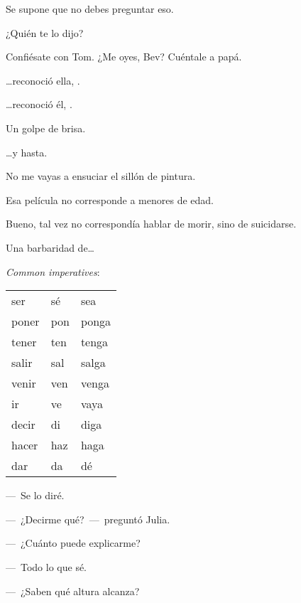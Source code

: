 \sk
Se supone que no debes preguntar eso. 

\sk
¿Quién te lo dijo? 

\sk
Confiésate con Tom. ¿Me oyes, Bev? Cuéntale a papá.

\sk
\ldots{}reconoció ella, . 

\sk
\ldots{}reconoció él, . 

\sk
Un golpe de brisa. 

\sk
\ldots{}y hasta. 

\sk
No me vayas a ensuciar el sillón de pintura. 

\sk
Esa película no corresponde a menores de edad. 

\sk
Bueno, tal vez no correspondía hablar de morir, sino de suicidarse. 

\sk
Una barbaridad de\ldots{} 

\bsk
\textit{Common imperatives}:

\sk
\begin{tabular}{lll}
    ser   & sé  & sea\\
    poner & pon & ponga\\
    tener & ten & tenga\\
    salir & sal & salga\\
    venir & ven & venga\\
    ir    & ve  & vaya\\
    decir & di  & diga\\
    hacer & haz & haga\\
    dar   & da  & dé\\
\end{tabular}

\bsk
---~Se lo diré. 

---~¿Decirme qué?~---~preguntó Julia. 

\sk
---~¿Cuánto puede explicarme? 

---~Todo lo que sé. 

\sk
---~¿Saben qué altura alcanza? 

